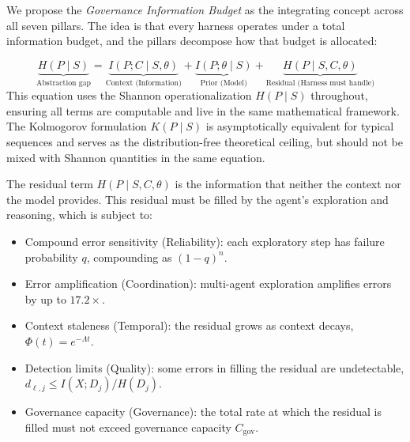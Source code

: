 \documentclass[11pt, a4paper, logo, copyright]{googledeepmind}
\begin{document}
We propose the \emph{Governance Information Budget} as the integrating concept across all seven pillars. The idea is that every harness operates under a total information budget, and the pillars decompose how that budget is allocated:

\begin{equation}
\label{eq:gib}
    \underbrace{H(P \mid S)}_{\text{Abstraction gap}} = \underbrace{I(P; C \mid S, \theta)}_{\text{Context (Information)}} + \underbrace{I(P; \theta \mid S)}_{\text{Prior (Model)}} + \underbrace{H(P \mid S, C, \theta)}_{\text{Residual (Harness must handle)}}
\end{equation}
This equation uses the Shannon operationalization $H(P \mid S)$ throughout, ensuring all terms are computable and live in the same mathematical framework. The Kolmogorov formulation $K(P \mid S)$ is asymptotically equivalent for typical sequences \citep{vitanyi2004shannon} and serves as the distribution-free theoretical ceiling, but should not be mixed with Shannon quantities in the same equation.

The residual term $H(P \mid S, C, \theta)$ is the information that neither the context nor the model provides. This residual must be filled by the agent's exploration and reasoning, which is subject to:
\begin{itemize}[nosep]
    \item Compound error sensitivity (Reliability): each exploratory step has failure probability $q$, compounding as $(1-q)^n$.
    \item Error amplification (Coordination): multi-agent exploration amplifies errors by up to $17.2\times$.
    \item Context staleness (Temporal): the residual grows as context decays, $\Phi(t) = e^{-\Lambda t}$.
    \item Detection limits (Quality): some errors in filling the residual are undetectable, $d_{\ell,j} \leq I(X; D_j)/H(D_j)$.
    \item Governance capacity (Governance): the total rate at which the residual is filled must not exceed governance capacity $C_{\text{gov}}$.
\end{itemize}
\end{document}
